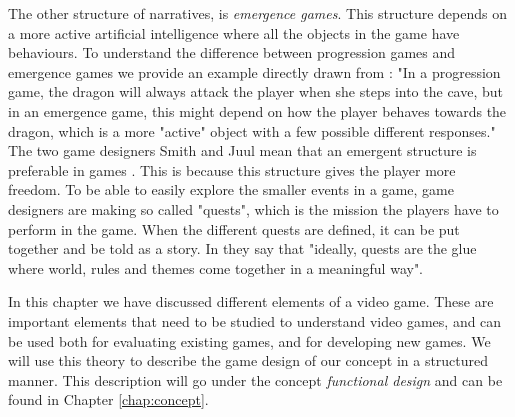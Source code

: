 The other structure of narratives, is \emph{emergence games}. This structure depends on a more active artificial intelligence where all the objects in the game have behaviours. To understand the difference between progression games and emergence games we provide an example directly drawn from \cite{understandingvg}: "In a progression game, the dragon will always attack the player when she steps into the cave, but in an emergence game, this might depend on how the player behaves towards the dragon, which is a more "active" object with a few possible different responses." The two game designers Smith and Juul mean that an emergent structure is preferable in games \cite{understandingvg}. This is because this structure gives the player more freedom. To be able to easily explore the smaller events in a game, game designers are making so called "quests", which is the mission the players have to perform in the game. When the different quests are defined, it can be put together and be told as a story. In \cite{understandingvg} they say that "ideally, quests are the glue where world, rules and themes come together in a meaningful way".

In this chapter we have discussed different elements of a video game. These are important elements that need to be studied to understand video games, and can be used both for evaluating existing games, and for developing new games. We will use this theory to describe the game design of our concept in a structured manner. This description will go under the concept \emph{functional design} and can be found in Chapter \ref{chap:concept}.

